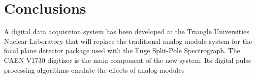 










\section{Conclusions}

A digital data acquisition system has been developed at the Triangle Universities Nuclear Laboratory that will replace the traditional analog module system for the focal plane detector package used with the Enge Split-Pole Spectrograph. The CAEN V1730 digitizer is the main component of the new system. Its digital pulse processing algorithms emulate the effects of analog modules
